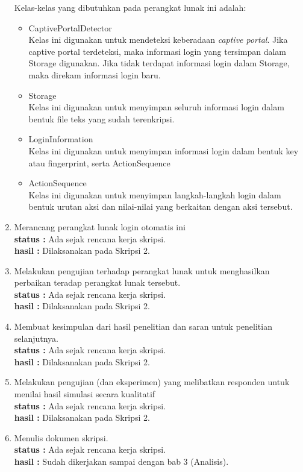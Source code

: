 \documentclass[a4paper,twoside]{article}
\begin{document}
\begin{enumerate}
        Kelas-kelas yang dibutuhkan pada perangkat lunak ini adalah:
        
        \begin{itemize}
            \item{CaptivePortalDetector\\Kelas ini digunakan untuk mendeteksi keberadaan \textit{captive portal}. Jika captive portal terdeteksi, maka informasi login yang tersimpan dalam Storage digunakan. Jika tidak terdapat informasi login dalam Storage, maka direkam informasi login baru.}
            \item{Storage\\Kelas ini digunakan untuk menyimpan seluruh informasi login dalam bentuk file teks yang sudah terenkripsi.}
            \item{LoginInformation\\Kelas ini digunakan untuk menyimpan informasi login dalam bentuk key atau fingerprint, serta ActionSequence}
            \item{ActionSequence\\Kelas ini digunakan untuk menyimpan langkah-langkah login dalam bentuk urutan aksi dan nilai-nilai yang berkaitan dengan aksi tersebut.}
        \end{itemize}

		\item Merancang perangkat lunak login otomatis ini\\
		{\bf status :} Ada sejak rencana kerja skripsi.\\
		{\bf hasil :} Dilaksanakan pada Skripsi 2.

		\item  Melakukan pengujian terhadap perangkat lunak untuk menghasilkan perbaikan teradap perangkat
lunak tersebut.\\
		{\bf status :} Ada sejak rencana kerja skripsi. \\
		{\bf hasil :} Dilaksanakan pada Skripsi 2.

		\item Membuat kesimpulan dari hasil penelitian dan saran untuk penelitian selanjutnya.\\
		{\bf status :} Ada sejak rencana kerja skripsi.\\
		{\bf hasil :} Dilaksanakan pada Skripsi 2.

		\item Melakukan pengujian (dan eksperimen) yang melibatkan responden untuk menilai hasil simulasi secara kualitatif\\
		{\bf status :} Ada sejak rencana kerja skripsi.\\
		{\bf hasil :} Dilaksanakan pada Skripsi 2.

		\item Menulis dokumen skripsi.\\
		{\bf status :} Ada sejak rencana kerja skripsi.\\
		{\bf hasil :} Sudah dikerjakan sampai dengan bab 3 (Analisis).

	\end{enumerate}
\end{document}
